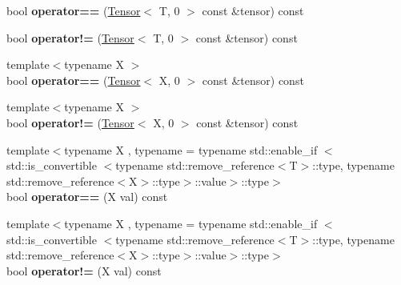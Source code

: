 \begin{DoxyCompactItemize}
\item 
bool {\bfseries operator==} (\hyperlink{classtensor_1_1Tensor}{Tensor}$<$ T, 0 $>$ const \&tensor) const \hypertarget{classtensor_1_1Tensor_3_01T_00_010_01_4_af647ac0a9c9f33515650332e3b6a1136}{}\label{classtensor_1_1Tensor_3_01T_00_010_01_4_af647ac0a9c9f33515650332e3b6a1136}

\item 
bool {\bfseries operator!=} (\hyperlink{classtensor_1_1Tensor}{Tensor}$<$ T, 0 $>$ const \&tensor) const \hypertarget{classtensor_1_1Tensor_3_01T_00_010_01_4_ae1a58b0ce9338450de4b096a66d07cd5}{}\label{classtensor_1_1Tensor_3_01T_00_010_01_4_ae1a58b0ce9338450de4b096a66d07cd5}

\item 
{\footnotesize template$<$typename X $>$ }\\bool {\bfseries operator==} (\hyperlink{classtensor_1_1Tensor}{Tensor}$<$ X, 0 $>$ const \&tensor) const \hypertarget{classtensor_1_1Tensor_3_01T_00_010_01_4_ac8256981d49bf0e9fea886462c7850ee}{}\label{classtensor_1_1Tensor_3_01T_00_010_01_4_ac8256981d49bf0e9fea886462c7850ee}

\item 
{\footnotesize template$<$typename X $>$ }\\bool {\bfseries operator!=} (\hyperlink{classtensor_1_1Tensor}{Tensor}$<$ X, 0 $>$ const \&tensor) const \hypertarget{classtensor_1_1Tensor_3_01T_00_010_01_4_aa593e4bb2d23d75b074849f66f8da6d6}{}\label{classtensor_1_1Tensor_3_01T_00_010_01_4_aa593e4bb2d23d75b074849f66f8da6d6}

\item 
{\footnotesize template$<$typename X , typename  = typename std\+::enable\+\_\+if $<$std\+::is\+\_\+convertible            $<$typename std\+::remove\+\_\+reference$<$\+T$>$\+::type,            typename std\+::remove\+\_\+reference$<$\+X$>$\+::type$>$\+::value$>$\+::type$>$ }\\bool {\bfseries operator==} (X val) const \hypertarget{classtensor_1_1Tensor_3_01T_00_010_01_4_af3b425ad77e864e1d6655923f8dcb68e}{}\label{classtensor_1_1Tensor_3_01T_00_010_01_4_af3b425ad77e864e1d6655923f8dcb68e}

\item 
{\footnotesize template$<$typename X , typename  = typename std\+::enable\+\_\+if $<$std\+::is\+\_\+convertible            $<$typename std\+::remove\+\_\+reference$<$\+T$>$\+::type,            typename std\+::remove\+\_\+reference$<$\+X$>$\+::type$>$\+::value$>$\+::type$>$ }\\bool {\bfseries operator!=} (X val) const \hypertarget{classtensor_1_1Tensor_3_01T_00_010_01_4_ad589bdb2b8841ead4b4a1dcd23e0595a}{}\label{classtensor_1_1Tensor_3_01T_00_010_01_4_ad589bdb2b8841ead4b4a1dcd23e0595a}


\end{DoxyCompactItemize}
